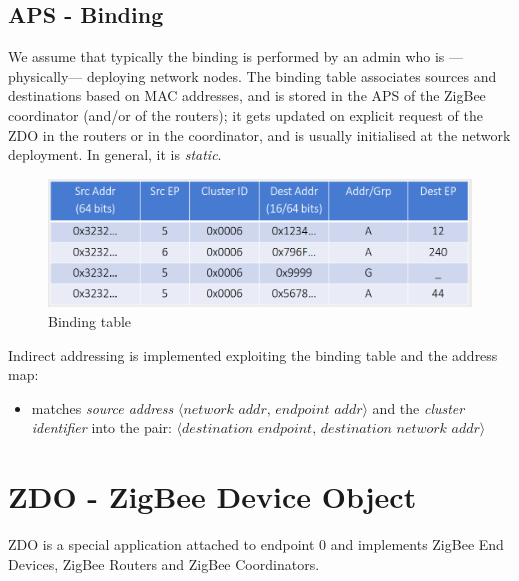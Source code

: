 \subsection{APS - Binding}
We assume that typically the binding is performed by an admin who is ---physically--- deploying network nodes. 
The binding table associates sources and destinations based on MAC addresses, and is stored in the APS of the ZigBee coordinator (and/or of the routers); it gets updated on explicit request of the ZDO in the routers or in the
coordinator, and is usually initialised at the network deployment.
In general, it is \textit{static}.

\begin{figure}[htbp]
   \centering
   \includegraphics{images/zigbee_bindingtable.png}
   \caption{Binding table}
   \label{fig:zigbee_bindingtable}
\end{figure}

Indirect addressing is implemented exploiting the binding table and the address map:
\begin{itemize}
   \item 
   matches \textit{source address} $\langle \textit{network addr, endpoint addr}\rangle$ and the
   \textit{cluster identifier} into the pair:
   $\langle \textit{destination endpoint, destination network addr}\rangle$
\end{itemize}

\section{ZDO - ZigBee Device Object}
ZDO is a special application attached to endpoint 0 and  implements ZigBee End Devices, ZigBee Routers and
ZigBee Coordinators.


